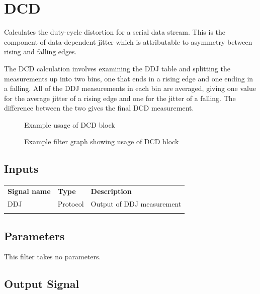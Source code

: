 \pagebreak
\section{DCD}
\label{filter:dcd}

Calculates the duty-cycle distortion for a serial data stream. This is the component of data-dependent jitter which is
attributable to asymmetry between rising and falling edges.

The DCD calculation involves examining the DDJ table and splitting the measurements up into two bins, one that ends in
a rising edge and one ending in a falling. All of the DDJ measurements in each bin are averaged, giving one value for
the average jitter of a rising edge and one for the jitter of a falling. The difference between the two gives the final
DCD measurement.

\begin{figure}[h]
\centering
{}
\caption{Example usage of DCD block}
\label{filter_dcd}
\end{figure}

\begin{figure}[h]
\centering
{}
\caption{Example filter graph showing usage of DCD block}
\label{filter_graph_dcd}
\end{figure}

\subsection{Inputs}

\begin{tabularx}{16cm}{llX}
\thickhline
\textbf{Signal name} & \textbf{Type} & \textbf{Description} \\
\thickhline
DDJ & Protocol & Output of DDJ measurement\\
\thickhline
\end{tabularx}

\subsection{Parameters}

This filter takes no parameters.

\subsection{Output Signal}

